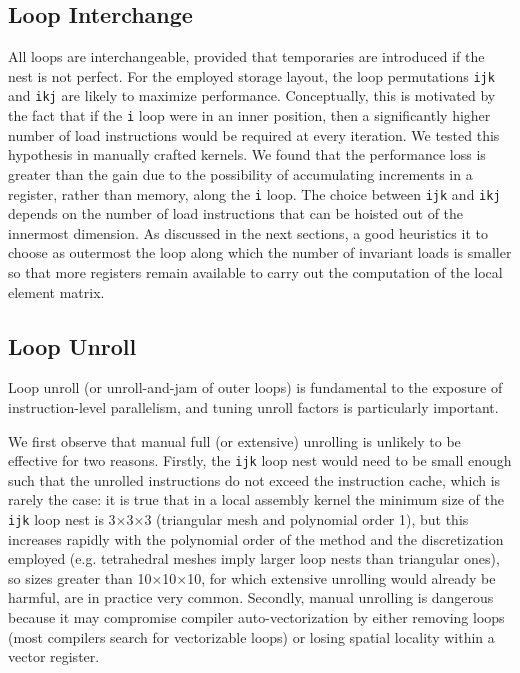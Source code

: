 \subsection{Loop Interchange}
\label{sec:coffee-genpurp-opts-interchange}
All loops are interchangeable, provided that temporaries are introduced if the nest is not perfect. For the employed storage layout, the loop permutations \texttt{ijk} and \texttt{ikj} are likely to maximize performance. Conceptually, this is motivated by the fact that if the \texttt{i} loop were in an inner position, then a significantly higher number of load instructions would be required at every iteration. We tested this hypothesis in manually crafted kernels. We found that the performance loss is greater than the gain due to the possibility of accumulating increments in a register, rather than memory, along the \texttt{i} loop. The choice between \texttt{ijk} and \texttt{ikj} depends on the number of load instructions that can be hoisted out of the innermost dimension. As discussed in the next sections, a good heuristics it to choose as outermost the loop along which the number of invariant loads is smaller so that more registers remain available to carry out the computation of the local element matrix.

\subsection{Loop Unroll}
Loop unroll (or unroll-and-jam of outer loops) is fundamental to the exposure of instruction-level parallelism, and tuning unroll factors is particularly important.

We first observe that manual full (or extensive) unrolling is unlikely to be effective for two reasons. Firstly, the \texttt{ijk} loop nest would need to be small enough such that the unrolled instructions do not exceed the instruction cache, which is rarely the case: it is true that in a local assembly kernel the minimum size of the \texttt{ijk} loop nest is 3$\times$3$\times$3 (triangular mesh and polynomial order 1), but this increases rapidly with the polynomial order of the method and the discretization employed (e.g. tetrahedral meshes imply larger loop nests than triangular ones), so sizes greater than 10$\times$10$\times$10, for which extensive unrolling would already be harmful, are in practice very common. Secondly, manual unrolling is dangerous because it may compromise compiler auto-vectorization by either removing loops (most compilers search for vectorizable loops) or losing spatial locality within a vector register.

